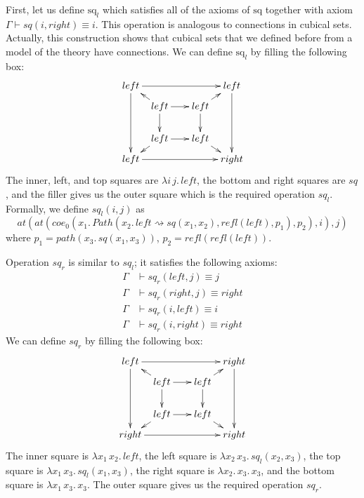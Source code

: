 \documentclass[reqno]{amsart}
\theoremstyle{definition}
\theoremstyle{remark}
\newcommand{\deq}{\equiv}
\newcommand{\idtype}{\rightsquigarrow}
\newcommand{\sq}{\mathrm{sq}}
\numberwithin{figure}{section}
\begin{document}
First, let us define $\sq_l$ which satisfies all of the axioms of $\sq$ together with axiom $\Gamma \vdash sq(i,right) \deq i$.
This operation is analogous to connections in cubical sets.
Actually, this construction shows that cubical sets that we defined before from a model of the theory have connections.
We can define $\sq_l$ by filling the following box:
\[ \xymatrix @C=0.5pc @R=0.5pc
    { left \ar[rrrr] \ar[dddd] &          & &                      & left \ar[dddd] \\
           & left \ar[rr] \ar[dd] \ar[ul] & & left \ar[dd] \ar[ur] & \\
           &                              & &                      & \\
           & left \ar[rr] \ar[dl]         & & left \ar[dr]         & \\
      left \ar[rrrr]           &          & &                      & right
    }\]
The inner, left, and top squares are $\lambda i\,j.\,left$, the bottom and right squares are $sq$,
and the filler gives us the outer square which is the required operation $sq_l$.
Formally, we define $sq_l(i,j)$ as
\[ at(at(coe_0(x_1.\,Path(x_2.\,left \idtype sq(x_1,x_2), refl(left), p_1), p_2),i),j) \]
where $p_1 = path(x_3.\,sq(x_1,x_3))$, $p_2 = refl(refl(left))$.

Operation $sq_r$ is similar to $sq_l$; it satisfies the following axioms:
\begin{align*}
\Gamma & \vdash sq_r(left,j) \deq j \\
\Gamma & \vdash sq_r(right,j) \deq right \\
\Gamma & \vdash sq_r(i,left) \deq i \\
\Gamma & \vdash sq_r(i,right) \deq right
\end{align*}
We can define $sq_r$ by filling the following box:
\[ \xymatrix @C=0.5pc @R=0.5pc
    { left \ar[rrrr] \ar[dddd] &          & &                      & right \ar[dddd] \\
           & left \ar[rr] \ar[dd] \ar[ul] & & left \ar[dd] \ar[ur] & \\
           &                              & &                      & \\
           & left \ar[rr] \ar[dl]         & & left \ar[dr]         & \\
      right \ar[rrrr]           &         & &                      & right
    }\]
The inner square is $\lambda x_1\,x_2.\,left$, the left square is $\lambda x_2\,x_3.\,sq_l(x_2,x_3)$,
the top square is $\lambda x_1\,x_3.\,sq_l(x_1,x_3)$, the right square is $\lambda x_2.\,x_3.\,x_3$,
and the bottom square is $\lambda x_1\,x_3.\,x_3$.
The outer square gives us the required operation $sq_r$.
\end{document}
